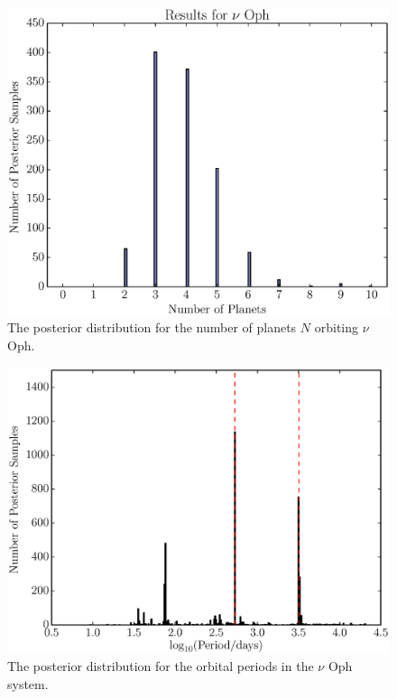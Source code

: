 \documentclass[useAMS,usenatbib]{mn2e}
\begin{document}
\begin{figure}
\includegraphics[scale=0.45]{Figures/nu_oph_N.eps}
\caption{The posterior distribution for the number of planets $N$ orbiting
$\nu$ Oph.\label{fig:nu_oph_N}}
\end{figure}

\begin{figure}
\includegraphics[scale=0.45]{Figures/nu_oph_periods.eps}
\caption{The posterior distribution for the orbital periods in the $\nu$ Oph
system.\label{fig:nu_oph_periods}}
\end{figure}
\end{document}
